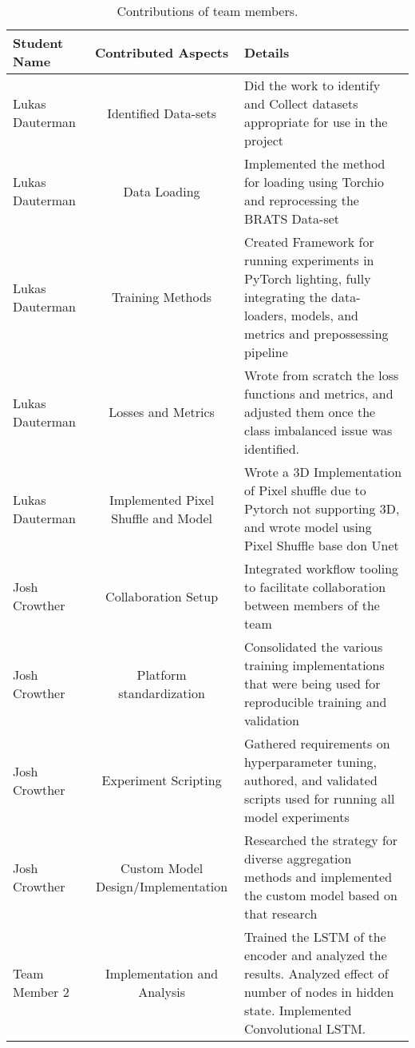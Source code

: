 \documentclass[10pt,twocolumn,letterpaper]{article}
\begin{document}
\begin{table*}
\begin{center}
\begin{tabular}{|l|c|p{8cm}|}
\hline
Student Name & Contributed Aspects & Details \\
\hline\hline

Lukas Dauterman & Identified Data-sets & Did the work to identify and Collect datasets appropriate for use in the project \\
Lukas Dauterman & Data Loading & Implemented the method for loading using Torchio and reprocessing the BRATS Data-set \\
Lukas Dauterman & Training Methods & Created Framework for running experiments in  PyTorch lighting, fully integrating the data-loaders, models, and metrics and prepossessing pipeline \\
Lukas Dauterman & Losses and Metrics & Wrote from scratch the loss functions and metrics, and adjusted them once the class imbalanced issue was identified. \\
Lukas Dauterman & Implemented Pixel Shuffle and Model & Wrote a 3D Implementation of Pixel shuffle due to Pytorch not supporting 3D, and wrote model using Pixel Shuffle base don Unet \\

Josh Crowther & Collaboration Setup & Integrated workflow tooling to facilitate collaboration between members of the team \\
Josh Crowther & Platform standardization & Consolidated the various training implementations that were being used for reproducible training and validation \\
Josh Crowther & Experiment Scripting & Gathered requirements on hyperparameter tuning, authored, and validated scripts used for running all model experiments \\
Josh Crowther & Custom Model Design/Implementation & Researched the strategy for diverse aggregation methods and implemented the custom model based on that research \\



Team Member 2 & Implementation and Analysis & Trained the LSTM of the encoder and analyzed the results. Analyzed effect of number of nodes in hidden state.  Implemented Convolutional LSTM. \\
\hline
\end{tabular}
\end{center}
\caption{Contributions of team members.}
\label{tab:contributions}
\end{table*}
\end{document}
